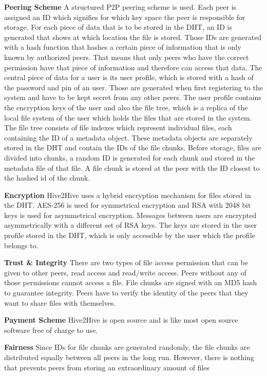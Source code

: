 \textbf{Peering Scheme}
A structured P2P peering scheme is used. Each peer is assigned an ID which signifies for which key space the peer is responsible for storage. For each piece of data that is to be stored in the DHT, an ID is generated that shows at which location the file is stored. Those IDs are generated with a hash function that hashes a certain piece of information that is only known by authorized peers. That means that only peers who have the correct permission have that piece of information and therefore can access that data.
The central piece of data for a user is its user profile, which is stored with a hash of the password and pin of an user. Those are generated when first registering to the system and have to be kept secret from any other peers. The user profile contains the encryption keys of the user and also the file tree, which is a replica of the local file system of the user which holds the files that are stored in the system. The file tree consists of file indexes which represent individual files, each containing the ID of a metadata object. These metadata objects are separately stored in the DHT and contain the IDs of the file chunks. Before storage, files are divided into chunks, a random ID is generated for each chunk and stored in the metadata file of that file. A file chunk is stored at the peer with the ID closest to the hashed id of the chunk.

\textbf{Encryption}
Hive2Hive uses a hybrid encryption mechanism for files stored in the DHT. AES-256 is used for symmetrical encryption and RSA with 2048 bit keys is used for asymmetrical encryption. Messages between users are encrypted asymmetrically with a different set of RSA keys.
The keys are stored in the user profile stored in the DHT, which is only accessible by the user which the profile belongs to.

\textbf{Trust \& Integrity}
There are two types of file access permission that can be given to other peers, read access and read/write access. Peers without any of those permissions cannot access a file. File chunks are signed with an MD5 hash to guarantee integrity. Peers have to verify the identity of the peers that they want to share files with themselves.

\textbf{Payment Scheme}
Hive2Hive is open source and is like most open source software free of charge to use.

\textbf{Fairness}
Since IDs for file chunks are generated randomly, the file chunks are distributed equally between all peers in the long run. However, there is nothing that prevents peers from storing an extraordinary amount of files


